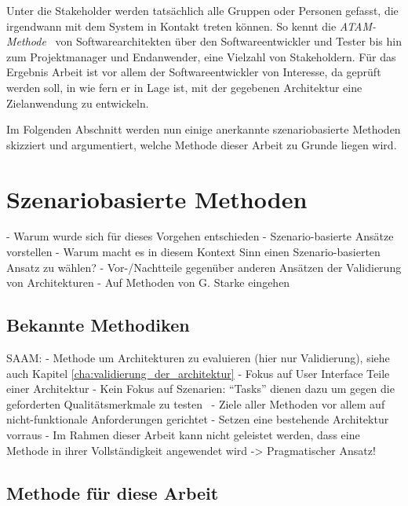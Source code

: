   Unter die Stakeholder werden tatsächlich alle Gruppen oder Personen gefasst, die irgendwann mit dem System in Kontakt treten können. So kennt die \emph{ATAM-Methode}~ von Softwarearchitekten über den Softwareentwickler und Tester bis hin zum Projektmanager und Endanwender, eine Vielzahl von Stakeholdern. Für das Ergebnis Arbeit ist vor allem der Softwareentwickler von Interesse, da geprüft werden soll, in wie fern er in Lage ist, mit der gegebenen Architektur eine Zielanwendung zu entwickeln.
  
  Im Folgenden Abschnitt werden nun einige anerkannte szenariobasierte Methoden skizziert und argumentiert, welche Methode dieser Arbeit zu Grunde liegen wird.

  
\section{Szenariobasierte Methoden} %
\label{sec:szenariobasierte_methoden}
  
- Warum wurde sich für dieses Vorgehen entschieden
- Szenario-basierte Ansätze vorstellen
- Warum macht es in diesem Kontext Sinn einen Szenario-basierten Ansatz zu wählen?
- Vor-/Nachtteile gegenüber anderen Ansätzen der Validierung von Architekturen
- Auf Methoden von G. Starke eingehen

\subsection{Bekannte Methodiken} %
\label{sub:bekannte_methodiken}

SAAM:
- Methode um Architekturen zu evaluieren (hier nur Validierung), siehe auch Kapitel \ref{cha:validierung_der_architektur}
- Fokus auf User Interface Teile einer Architektur
- Kein Fokus auf Szenarien: "`Tasks"' dienen dazu um gegen die geforderten Qualitätsmerkmale zu testen~\citep[S. 82]{saam}
- Ziele aller Methoden vor allem auf nicht-funktionale Anforderungen gerichtet
- Setzen eine bestehende Architektur vorraus
- Im Rahmen dieser Arbeit kann nicht geleistet werden, dass eine Methode in ihrer Vollständigkeit angewendet wird -> Pragmatischer Ansatz!


\subsection{Methode für diese Arbeit} %
\label{sub:methode_fuer_diese_arbeit}

